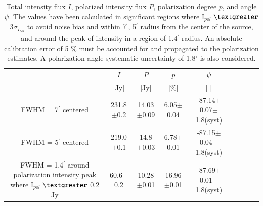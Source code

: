 \documentclass[twocolumn,traditabstract]{aa}
\begin{document}
\begin{table}
  \centering
      \begin{tabular}{ccccccccc}
      \hline
      \hline
       & $I$ & $P$ & $p$ & $\psi$  \\ 
                                         & [Jy]         &    [Jy]         & [\%]  & [$^\circ$] \\
      \hline
      \hline
    FWHM = 7$^{\prime}$ centered   & 231.8$\pm$0.2  & 14.03$\pm$0.09 & 6.05$\pm$0.04 & -87.14$\pm$0.07$\pm$1.8(syst)  \\ 
 
          FWHM = 5$^{\prime}$ centered & 219.0$\pm$0.1  & 14.8 $\pm$0.03 & 6.78$\pm$0.01 & -87.15$\pm$0.04$\pm$1.8(syst)    \\ 
     	      
              FWHM = 1.4$^{\prime}$ around polarization intensity peak where I$_{pol}$ $\textgreater$ 0.2 Jy& 60.6$\pm$0.2 & 10.28$\pm$0.01  & 16.96$\pm$0.01 &-87.69$\pm$0.01$\pm$1.8(syst)\\
              
             
                \hline            
    \hline   
    \end{tabular}
   \caption{ Total intensity flux $I$, polarized intensity flux $P$,
     polarization degree $p$, and angle $\psi$. The values have been calculated
     in significant regions where I$_{pol}$ $\textgreater$ 3$\sigma_{I_{pol}}$ to avoid noise bias and within 7$^{\prime}$, 5$^{\prime}$ radius from the center of the source, and around
     the peak of intensity in a region of 1.4$^{\prime}$ radius. An absolute
     calibration error of 5 $\%$ must be accounted for and propagated to the
     polarization estimates. A polarization angle systematic uncertainty of
     1.8$^{\circ}$ is also considered.
    }
    \label{tab:crab_results}
 \end{table}
  
\end{document}
